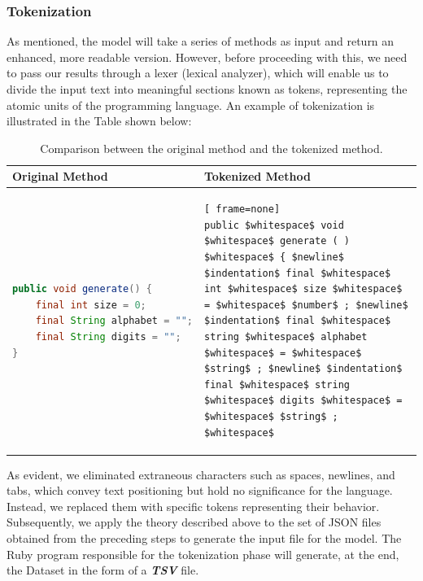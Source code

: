 \subsubsection{Tokenization} %
\label{sub:Tokenization}
As mentioned, the model will take a series of methods as input and return an enhanced, more readable version. However, before proceeding with this, we need to pass our results through a lexer (lexical analyzer), which will enable us to divide the input text into meaningful sections known as tokens, representing the atomic units of the programming language. \newline
An example of tokenization is illustrated in the Table shown below:
\begin{table}[h!]
	\centering
	\begin{tabular}{|p{7cm}|p{7cm}|}
		\hline
		\textbf{Original Method}                      & \textbf{Tokenized Method}                                                                                                                                                                                                                                                                                                                                          \\
		\hline
		\begin{lstlisting}[language=Java, frame=none]
public void generate() {
    final int size = 0;
    final String alphabet = "";
    final String digits = "";
}
        \end{lstlisting} &
		\begin{lstlisting}[ frame=none]
public $whitespace$ void $whitespace$ generate ( ) $whitespace$ { $newline$ $indentation$ final $whitespace$ int $whitespace$ size $whitespace$ = $whitespace$ $number$ ; $newline$ $indentation$ final $whitespace$ string $whitespace$ alphabet $whitespace$ = $whitespace$ $string$ ; $newline$ $indentation$ final $whitespace$ string $whitespace$ digits $whitespace$ = $whitespace$ $string$ ; $whitespace$ 
        \end{lstlisting} \\
		\hline
	\end{tabular}
	\label{tab:tokenization}
	\caption{Comparison between the original method and the tokenized method.}
\end{table}
\newline
As evident, we eliminated extraneous characters such as spaces, newlines, and tabs, which convey text positioning but hold no significance for the language. Instead, we replaced them with specific tokens representing their behavior. Subsequently, we apply the theory described above to the set of JSON files obtained from the preceding steps to generate the input file for the model. The Ruby program responsible for the tokenization phase will generate, at the end, the Dataset in the form of a \textbf{\textit{TSV}} file.

